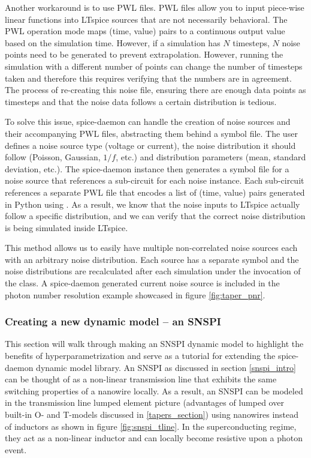 Another workaround is to use PWL files. PWL files allow you to input piece-wise linear functions into LTspice
sources that are not necessarily behavioral. The PWL operation mode maps (time, value) pairs to a continuous 
output value based on the simulation time. However, if a simulation has $N$ timesteps, $N$ noise points need to be generated to prevent extrapolation.
However, running the simulation with a different number of points can change the number
of timesteps taken and therefore this requires verifying that the numbers are in agreement.
The process of re-creating this noise file, ensuring there are enough data points as timesteps and that the noise data follows a certain distribution is tedious.

To solve this issue, spice-daemon can handle the creation of noise sources and their accompanying PWL files,
abstracting them behind a symbol file. The user defines a noise source type (voltage or current), the 
noise distribution it should follow (Poisson, Gaussian, $1/f$, etc.) and distribution parameters (mean, 
standard deviation, etc.). The spice-daemon instance then generates a symbol file for a noise source that 
references a sub-circuit for each noise instance. Each sub-circuit references a 
separate PWL file that encodes a list of (time, value) pairs generated in Python using
. As a result, we know that the noise inputs to LTspice actually follow a specific distribution, and we
can verify that the correct noise distribution is being simulated inside LTspice.

This method  allows us to easily have multiple non-correlated noise sources each with an 
arbitrary noise  distribution. Each source has a separate symbol and the noise 
distributions are recalculated after each simulation under the invocation of the 
class. A spice-daemon generated current noise source is included in the photon number resolution 
example showcased in figure \ref{fig:taper_pnr}.


\subsubsection{Creating a new dynamic model -- an SNSPI}

This section will walk through making an SNSPI dynamic model to highlight the benefits
of hyperparametrization and serve as a tutorial for extending the spice-daemon dynamic model library. 
An SNSPI as discussed in section \ref{snspi_intro} can be thought
of as a non-linear transmission line that exhibits the same switching properties of a nanowire
locally. As a result, an SNSPI can be modeled in the transmission line lumped element picture
(advantages of lumped over built-in O- and T-models discussed in \ref{tapers_section})
using nanowires instead of inductors as shown in figure
\ref{fig:snspi_tline}. In the superconducting regime, they act as a non-linear
inductor and can locally become resistive upon a photon event.

